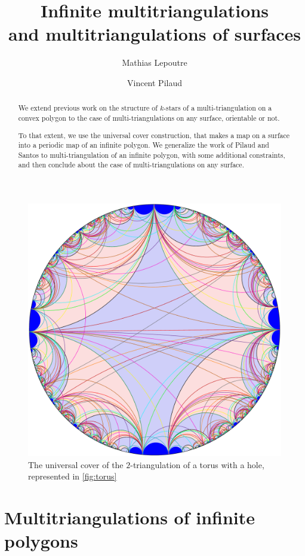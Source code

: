 \documentclass{amsart}
\title[Infinite multitriangulations and multitriangulations of surfaces]{Infinite multitriangulations \\ and multitriangulations of surfaces}
\author{Mathias Lepoutre}
\author{Vincent Pilaud}
\theoremstyle{remark}
\begin{document}
\begin{abstract}
We extend previous work on the structure of $k$-stars of a multi-triangulation on a convex polygon to the case of multi-triangulations on any surface, orientable or not. 

To that extent, we use the universal cover construction, that makes a map on a surface into a periodic map of an infinite polygon. We generalize the work of Pilaud and Santos to multi-triangulation of an infinite polygon, with some additional constraints, and then conclude about the case of multi-triangulations on any surface.
\end{abstract}

\maketitle

\begin{figure}[h]
	\capstart
	\centerline{\includegraphics[scale=.42]{torus}}
	\caption{The universal cover of the $2$-triangulation of a torus with a hole, represented in \cref{fig:torus}}
	\label{fig:UCtorus}
\end{figure}


\section{Multitriangulations of infinite polygons}
\label{sec:infiniteMultitriangulations}
\end{document}
